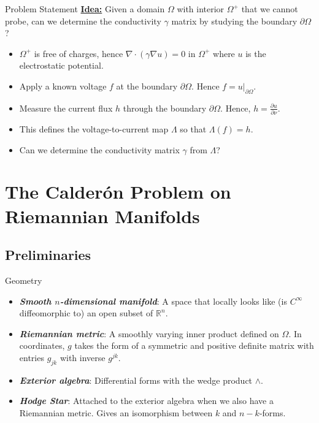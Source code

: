\documentclass[aspectratio=169]{beamer}
\newcommand\boldgreen[1]{\textcolor{lighter_csu_green}{\emph{\textbf{#1}}}}
\newcommand{\R}{\mathbb{R}}
\begin{document}
\begin{frame}{Problem Statement}
\vfill
    \textbf{\underline{Idea:}} Given a domain $\Omega$ with interior $\Omega^+$ that we cannot probe, can we determine the conductivity $\gamma$ matrix by studying the boundary $\partial \Omega$? 
    \pause
    \begin{itemize}
        \item $\Omega^+$ is free of charges, hence $\nabla \cdot (\gamma \nabla u) = 0$ in $\Omega^+$ where $u$ is the electrostatic potential.
        
        \pause
        \item Apply a known voltage $f$ at the boundary $\partial \Omega$. Hence $f = u \vert_{\partial \Omega}$.
        
        \pause
        \item Measure the current flux $h$ through the boundary $\partial \Omega$. Hence, $h = \frac{\partial u}{\partial \nu}$.
        
        \pause
        \item This defines the voltage-to-current map $\Lambda$ so that $\Lambda(f) = h$.
        
        \pause
        \item Can we determine the conductivity matrix $\gamma$ from $\Lambda$?
    \end{itemize}
\vfill
\end{frame}


\section{The Calder\'on Problem on Riemannian Manifolds}

\subsection{Preliminaries}

\begin{frame}{Geometry}
\vfill
    \pause
    \begin{itemize}
        \item \boldgreen{Smooth $n$-dimensional manifold}: A space that locally looks like (is $C^\infty$ diffeomorphic to) an open subset of $\R^n$.
        
        \pause 
        \item \boldgreen{Riemannian metric}: A smoothly varying inner product defined on $\Omega$.  In coordinates, $g$ takes the form of a symmetric and positive definite matrix with entries $g_{jk}$ with inverse $g^{jk}$.
        
        \pause
        \item \boldgreen{Exterior algebra}: Differential forms with the wedge product $\wedge$.
        
        \pause
        \item \boldgreen{Hodge Star}: Attached to the exterior algebra when we also have a Riemannian metric.  Gives an isomorphism between $k$ and $n-k$-forms.
    \end{itemize}
\vfill
\end{frame}
\end{document}
